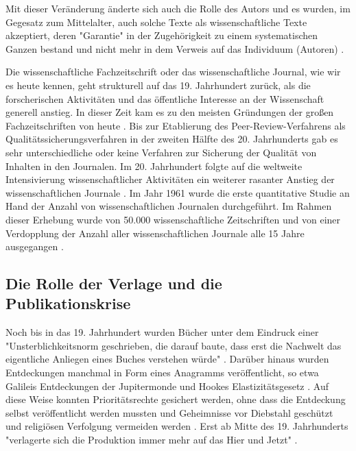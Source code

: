 Mit dieser Veränderung änderte sich auch die Rolle des Autors und es wurden, im Gegesatz zum Mittelalter, auch solche Texte als wissenschaftliche Texte akzeptiert, deren "Garantie" in der Zugehörigkeit zu einem systematischen Ganzen bestand und nicht mehr in dem Verweis auf das Individuum (Autoren) \cite{foucault_2000_autor}.

Die wissenschaftliche Fachzeitschrift oder das wissenschaftliche Journal, wie wir es heute kennen, geht strukturell auf das 19. Jahrhundert zurück, als die forscherischen Aktivitäten und das öffentliche Interesse an der Wissenschaft generell anstieg. In dieser Zeit kam es zu den meisten Gründungen der großen Fachzeitschriften von heute \cite{porter_1964_scientific}. Bis zur Etablierung des Peer-Review-Verfahrens als Qualitätssicherungsverfahren in der zweiten Hälfte des 20. Jahrhunderts gab es sehr unterschiedliche oder keine Verfahren zur Sicherung der Qualität von Inhalten in den Journalen. Im 20. Jahrhundert folgte auf die weltweite Intensivierung wissenschaftlicher Aktivitäten ein weiterer rasanter Anstieg der wissenschaftlichen Journale \cite[:23]{haustein_2012_multidimensional}. Im Jahr 1961 wurde die erste quantitative Studie an Hand der Anzahl von wissenschaftlichen Journalen durchgeführt. Im Rahmen dieser Erhebung wurde von 50.000 wissenschaftliche Zeitschriften und von einer Verdopplung der Anzahl aller wissenschaftlichen Journale alle 15 Jahre ausgegangen \cite{de_1982_little}.

\subsection{Die Rolle der Verlage und die Publikationskrise}

Noch bis in das 19. Jahrhundert wurden Bücher unter dem Eindruck einer "Unsterblichkeitsnorm geschrieben, die darauf baute, dass erst die Nachwelt das eigentliche Anliegen eines Buches verstehen würde" \cite{hagner_2015_sache_buches}. Darüber hinaus wurden Entdeckungen manchmal in Form eines Anagramms veröffentlicht, so etwa Galileis Entdeckungen der Jupitermonde \cite{miner2007discovery} und Hookes Elastizitätsgesetz \cite{szabo_2013_geschichte}. Auf diese Weise konnten Prioritätsrechte gesichert werden, ohne dass die Entdeckung selbst veröffentlicht werden mussten \cite{miner2007discovery} und Geheimnisse vor Diebstahl geschützt und religiösen Verfolgung vermeiden werden \cite{resnik_2005_ethics}. Erst ab Mitte des 19. Jahrhunderts "verlagerte sich die Produktion immer mehr auf das Hier und Jetzt" \cite{hagner_2015_sache_buches}.

